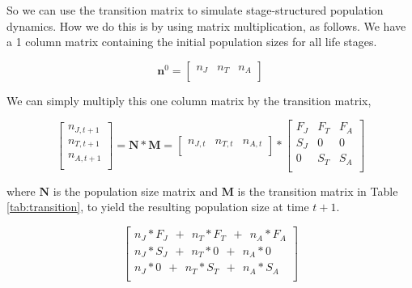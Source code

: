 \documentclass[12pt]{article}
\begin{document}
So we can use the transition matrix to simulate stage-structured population dynamics. How we do this is by using matrix multiplication, as follows. We have a 1 column matrix containing the initial population sizes for all life stages. 

\begin{equation*}
\mathbf{n}^{0}=%
\begin{bmatrix}
n_{J} & n_{T} & n_{A} \\
\end{bmatrix}
\end{equation*}


We can simply multiply this one column matrix by the transition matrix, 


\begin{equation*}
\begin{bmatrix}
n_{J, t+1} \\ 
n_{T, t+1} \\ 
n_{A, t+1} \\
\end{bmatrix}
= \mathbf{N} * \mathbf{M} = \begin{bmatrix}
n_{J, t} & n_{T, t} & n_{A, t} \\
\end{bmatrix} * \begin{bmatrix}
F_{J}  & F_{T}  & F_{A}  \\
S_{J}  & 0      & 0      \\
0       & S_{T}  & S_{A}  \\
\end{bmatrix}
\end{equation*}


where $\mathbf{N}$ is the population size matrix and $\mathbf{M}$ is the transition matrix in Table \ref{tab:transition}, to yield the resulting population size at time $t+1$. 


\begin{equation}
\begin{bmatrix}
n_{J}* F_{J} \ \  + \ \ n_{T} * F_{T}   \ \  + \ \  n_{A} * F_{A} \\
n_{J}* S_{J} \ \ + \ \  n_{T} * 0      \ \   + \ \  n_{A} * 0    \\
n_{J}* 0     \ \ + \ \  n_{T} * S_{T}  \ \   +  \ \ n_{A} * S_{A}    \\
\end{bmatrix}
\end{equation}





\bigskip
\end{document}
